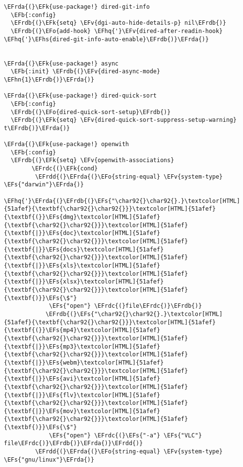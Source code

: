 \documentclass[a4wide,10pt]{article}
\newcommand{\EFs}[1]{\textcolor{EFs}{#1}} %
\newcommand{\EFk}[1]{\textcolor{EFk}{#1}} %
\newcommand{\EFb}[1]{\textcolor{EFb}{#1}} %
\newcommand{\EFv}[1]{\textcolor{EFv}{#1}} %
\newcommand{\EFo}[1]{\textcolor{EFo}{#1}} %
\newcommand{\EFhn}[1]{\textcolor{EFhn}{\textbf{#1}}} %
\newcommand{\EFhq}[1]{\textcolor{EFhq}{#1}} %
\newcommand{\EFhs}[1]{\textcolor{EFhs}{#1}} %
\newcommand{\EFrda}[1]{\textcolor{EFrda}{#1}} %
\newcommand{\EFrdb}[1]{\textcolor{EFrdb}{#1}} %
\newcommand{\EFrdc}[1]{\textcolor{EFrdc}{#1}} %
\newcommand{\EFrdd}[1]{\textcolor{EFrdd}{#1}} %
\begin{document}
\begin{Code}
\begin{Verbatim}
\EFrda{(}\EFk{use-package!} dired-git-info
  \EFb{:config}
  \EFrdb{(}\EFk{setq} \EFv{dgi-auto-hide-details-p} nil\EFrdb{)}
  \EFrdb{(}\EFo{add-hook} \EFhq{'}\EFv{dired-after-readin-hook} \EFhq{'}\EFhs{dired-git-info-auto-enable}\EFrdb{)}\EFrda{)}


\EFrda{(}\EFk{use-package!} async
  \EFb{:init} \EFrdb{(}\EFv{dired-async-mode} \EFhn{1}\EFrdb{)}\EFrda{)}

\EFrda{(}\EFk{use-package!} dired-quick-sort
  \EFb{:config}
  \EFrdb{(}\EFo{dired-quick-sort-setup}\EFrdb{)}
  \EFrdb{(}\EFk{setq} \EFv{dired-quick-sort-suppress-setup-warning} t\EFrdb{)}\EFrda{)}

\EFrda{(}\EFk{use-package!} openwith
  \EFb{:config}
  \EFrdb{(}\EFk{setq} \EFv{openwith-associations}
        \EFrdc{(}\EFk{cond}
         \EFrdd{(}\EFrda{(}\EFo{string-equal} \EFv{system-type} \EFs{"darwin"}\EFrda{)}
          \EFhq{'}\EFrda{(}\EFrdb{(}\EFs{"\char92{}\char92{}.}\textcolor[HTML]{51afef}{\textbf{\char92{}\char92{}}}\textcolor[HTML]{51afef}{\textbf{(}}\EFs{dmg}\textcolor[HTML]{51afef}{\textbf{\char92{}\char92{}}}\textcolor[HTML]{51afef}{\textbf{|}}\EFs{doc}\textcolor[HTML]{51afef}{\textbf{\char92{}\char92{}}}\textcolor[HTML]{51afef}{\textbf{|}}\EFs{docs}\textcolor[HTML]{51afef}{\textbf{\char92{}\char92{}}}\textcolor[HTML]{51afef}{\textbf{|}}\EFs{xls}\textcolor[HTML]{51afef}{\textbf{\char92{}\char92{}}}\textcolor[HTML]{51afef}{\textbf{|}}\EFs{xlsx}\textcolor[HTML]{51afef}{\textbf{\char92{}\char92{}}}\textcolor[HTML]{51afef}{\textbf{)}}\EFs{\$"}
             \EFs{"open"} \EFrdc{(}file\EFrdc{)}\EFrdb{)}
            \EFrdb{(}\EFs{"\char92{}\char92{}.}\textcolor[HTML]{51afef}{\textbf{\char92{}\char92{}}}\textcolor[HTML]{51afef}{\textbf{(}}\EFs{mp4}\textcolor[HTML]{51afef}{\textbf{\char92{}\char92{}}}\textcolor[HTML]{51afef}{\textbf{|}}\EFs{mp3}\textcolor[HTML]{51afef}{\textbf{\char92{}\char92{}}}\textcolor[HTML]{51afef}{\textbf{|}}\EFs{webm}\textcolor[HTML]{51afef}{\textbf{\char92{}\char92{}}}\textcolor[HTML]{51afef}{\textbf{|}}\EFs{avi}\textcolor[HTML]{51afef}{\textbf{\char92{}\char92{}}}\textcolor[HTML]{51afef}{\textbf{|}}\EFs{flv}\textcolor[HTML]{51afef}{\textbf{\char92{}\char92{}}}\textcolor[HTML]{51afef}{\textbf{|}}\EFs{mov}\textcolor[HTML]{51afef}{\textbf{\char92{}\char92{}}}\textcolor[HTML]{51afef}{\textbf{)}}\EFs{\$"}
             \EFs{"open"} \EFrdc{(}\EFs{"-a"} \EFs{"VLC"} file\EFrdc{)}\EFrdb{)}\EFrda{)}\EFrdd{)}
         \EFrdd{(}\EFrda{(}\EFo{string-equal} \EFv{system-type} \EFs{"gnu/linux"}\EFrda{)}

\end{Verbatim}
\end{Code}
\end{document}
